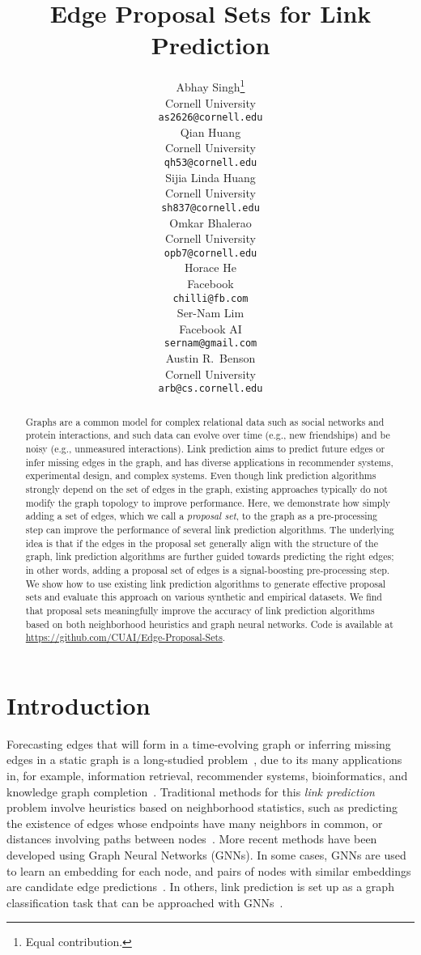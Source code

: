 \documentclass{article}
\title{Edge Proposal Sets for Link Prediction}
\author{Abhay Singh\thanks{Equal contribution.} \\
  Cornell University \\
  \texttt{as2626@cornell.edu} \\
  \And
  Qian Huang\printfnsymbol{1} \\
  Cornell University \\
  \texttt{qh53@cornell.edu} \\
  \And
  Sijia Linda Huang \\
  Cornell University \\
  \texttt{sh837@cornell.edu} \\
  \And
  Omkar Bhalerao \\
  Cornell University \\
  \texttt{opb7@cornell.edu} \\
  \And
  Horace He \\
  Facebook \\
  \texttt{chilli@fb.com} \\
  \And
  Ser-Nam Lim \\
  Facebook AI \\
  \texttt{sernam@gmail.com} \\
  \And
  Austin R.~Benson \\
  Cornell University \\
  \texttt{arb@cs.cornell.edu} \\
}
\begin{document}
\maketitle

\begin{abstract}
Graphs are a common model for complex relational data such as social networks and protein interactions, and
such data can evolve over time (e.g., new friendships) and be noisy (e.g., unmeasured interactions).
Link prediction aims to predict future edges or infer missing edges in the graph,
and has diverse applications in recommender systems, experimental design, and complex systems.
Even though link prediction algorithms strongly depend on the set of edges in the graph,
existing approaches typically do not modify the graph topology to improve performance.
Here, we demonstrate how simply adding a set of edges, which we call a \emph{proposal set}, to the graph as a pre-processing step can improve the performance of several link prediction algorithms.
The underlying idea is that if the edges in the proposal set
generally align with the structure of the graph,
link prediction algorithms are further guided towards predicting the right edges;
in other words, adding a proposal set of edges is a signal-boosting pre-processing step.
We show how to use existing link prediction algorithms to generate effective proposal sets
and evaluate this approach on various synthetic and empirical datasets.
We find that proposal sets meaningfully improve the accuracy of link prediction algorithms based on both neighborhood heuristics and graph neural networks. Code is available at \url{https://github.com/CUAI/Edge-Proposal-Sets}.
\end{abstract}


\section{Introduction}
Forecasting edges that will form in a time-evolving graph or inferring missing edges in a static graph is a long-studied problem~\cite{LibenNowell2007TheLP},
due to its many applications in, for example, information retrieval, recommender systems, bioinformatics, and knowledge graph completion~\cite{survey}.
Traditional methods for this \emph{link prediction} problem involve heuristics based on neighborhood statistics, such as predicting the existence of edges whose endpoints have many neighbors in common, or distances involving paths between nodes~\cite{adamic2003friends,LibenNowell2007TheLP,lu2011link,newman2001clustering}. 
More recent methods have been developed using Graph Neural Networks (GNNs).
In some cases, GNNs are used to learn an embedding for each node, and pairs of nodes with similar embeddings are candidate edge predictions~\cite{kipf2016variational}.
In others, link prediction is set up as a graph classification task that can be approached with GNNs~\cite{Zhang2018LinkPB}.
\end{document}
